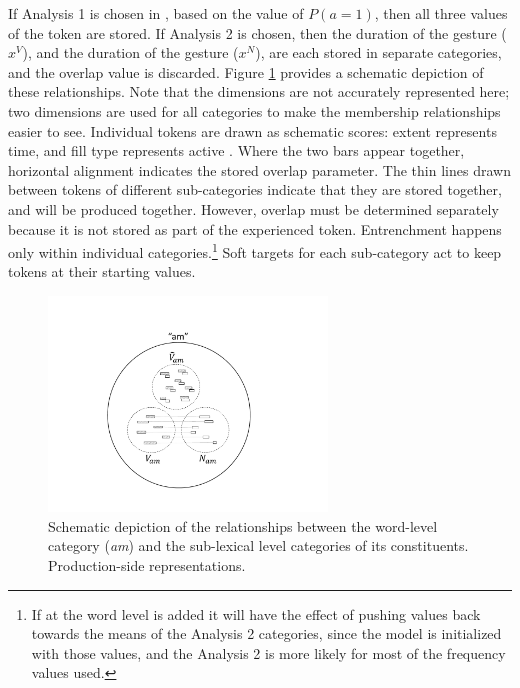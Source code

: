 If Analysis 1 is chosen in , based on the value of $P(a=1)$,
then all three values of the token are stored. If Analysis 2 is chosen,
then the duration of the  gesture ($x^{V}$), and the
duration of the  gesture ($x^{N}$), are each stored in separate
categories, and the overlap value is discarded. Figure \ref{fig:MultiParse-Reps}
provides a schematic depiction of these relationships. Note that the
dimensions are not accurately represented here; two dimensions are
used for all categories to make the membership relationships easier
to see. Individual tokens are drawn as schematic  scores:
extent represents time, and fill type represents active .
Where the two bars appear together, horizontal alignment indicates the stored  overlap parameter. The thin
lines drawn between tokens of different sub-categories indicate that
they are stored together, and will be produced together. However, overlap must
be determined separately because it is not stored as part of the experienced token. Entrenchment happens only
within individual  categories.\footnote{If  at the word level is added it will have the effect
of pushing values back towards the means of the Analysis 2 categories,
since the model is initialized with those values, and the Analysis 2
 is more likely for most of the frequency values used.} Soft targets for each sub-category act to keep tokens at their starting values. 

\begin{figure}[h]
\includegraphics[width=0.66\textwidth]{figures/MultiParseModel.pdf}\caption{\label{fig:MultiParse-Reps}Schematic depiction of the relationships
between the word-level category (\textit{am}) and the sub-lexical level
categories of its constituents. Production-side representations.}
\end{figure}

